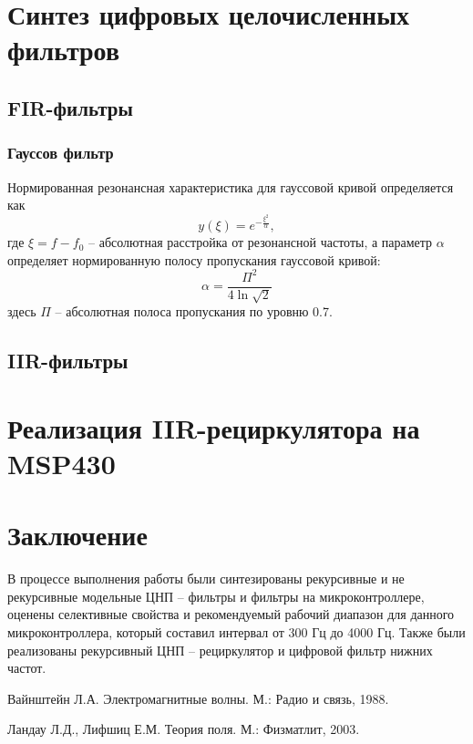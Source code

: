 \documentclass[a4paper,14pt]{extarticle}
\begin{document}
\section{Синтез цифровых целочисленных фильтров}
\subsection{FIR-фильтры}
\subsubsection{Гауссов фильтр}
Нормированная резонансная характеристика для гауссовой кривой определяется как
\begin{equation}
  y(\xi)=e^{-\frac{\xi^{2}}{\alpha}},
\end{equation}
где  $\xi=f-f_0$ -- абсолютная расстройка от резонансной частоты, а параметр $\alpha$  определяет нормированную полосу пропускания гауссовой кривой:
\begin{equation}
  \alpha=\frac{\Pi^{2}}{4 \ln \sqrt{2}}
\end{equation}
здесь $\Pi$ -- абсолютная полоса пропускания по уровню 0.7. 
\subsection{IIR-фильтры}

\section{Реализация IIR-рециркулятора на MSP430}






\section*{Заключение}

В процессе выполнения работы были синтезированы рекурсивные и не рекурсивные модельные  ЦНП – фильтры и фильтры на микроконтроллере, оценены селективные свойства и рекомендуемый рабочий диапазон для данного микроконтроллера, который составил интервал  от 300 Гц до 4000 Гц. Также были реализованы  рекурсивный ЦНП – рециркулятор   и цифровой фильтр нижних частот.

\begin{thebibliography}{}

   Вайнштейн Л.А. Электромагнитные волны. М.: Радио и связь, 1988.

   Ландау Л.Д., Лифшиц Е.М. Теория поля. М.: Физматлит, 2003.
\end{thebibliography}
\end{document}
